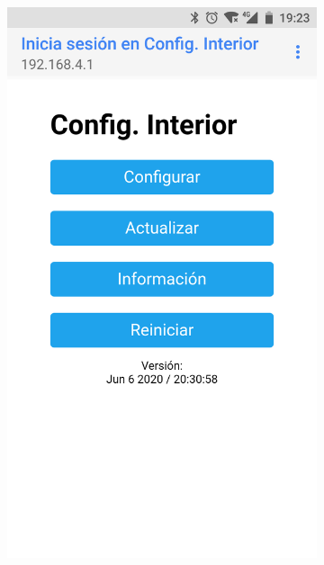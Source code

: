 \begin{figure}
\begin{subfigure}{0.49\columnwidth}
  \centering
  \includegraphics[width=1\columnwidth,frame]{images/interior-menu}
  \caption{}
  \label{fig:interior-menu}
\end{subfigure}
\hfill
\begin{subfigure}{0.49\columnwidth}
  \centering

\end{subfigure}
\end{figure}
